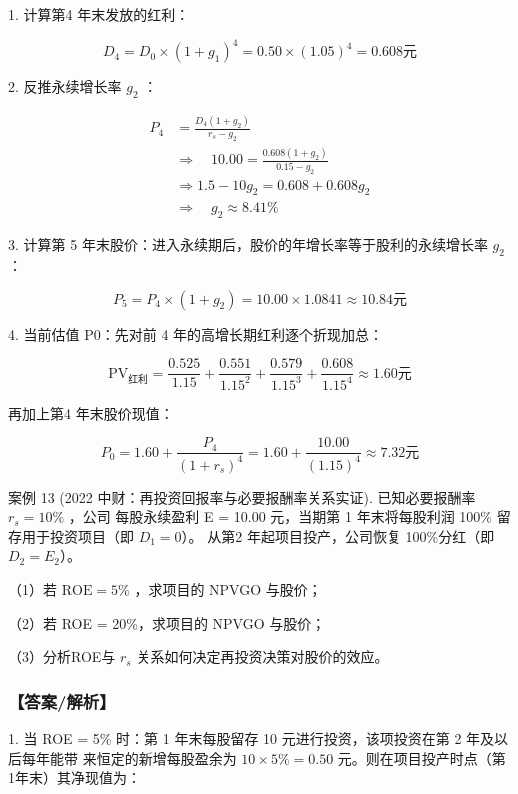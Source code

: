 \documentclass[lang=cn,10pt,color=blue]{elegantbook}
\begin{document}
1. 计算第4 年末发放的红利： 

$$
D _ {4} = D _ {0} \times (1 + g _ {1}) ^ {4} = 0. 5 0 \times (1. 0 5) ^ {4} = 0. 6 0 8 \text {元}
$$

2. 反推永续增长率 $g _ { 2 }$ ： 

$$
\begin{aligned}
  P _ {4} &= \frac {D _ {4} (1 + g _ {2})}{r _ {s} - g _ {2}} \\[1.2ex]
  &\Rightarrow \quad 1 0. 0 0 = \frac {0 . 6 0 8 (1 + g _ {2})}{0 . 1 5 - g _ {2}} \\[1.2ex]
  &\Rightarrow 1. 5 - 1 0 g _ {2} = 0. 6 0 8 + 0. 6 0 8 g _ {2} \\[1.2ex]
  &\Rightarrow \quad \boxed {g _ {2} \approx 8.41\%}
\end{aligned}
$$

3. 计算第 5 年末股价：进入永续期后，股价的年增长率等于股利的永续增长率 $g _ { 2 }$ ： 

$$
P _ {5} = P _ {4} \times (1 + g _ {2}) = 1 0. 0 0 \times 1. 0 8 4 1 \approx 1 0. 8 4 \text {元}
$$

4. 当前估值 P0：先对前 4 年的高增长期红利逐个折现加总： 

$$
\mathrm{PV} _ {\text {红利}} = \frac {0 . 5 2 5}{1 . 1 5} + \frac {0 . 5 5 1}{1 . 1 5 ^ {2}} + \frac {0 . 5 7 9}{1 . 1 5 ^ {3}} + \frac {0 . 6 0 8}{1 . 1 5 ^ {4}} \approx 1. 6 0 \text {元}
$$

再加上第4 年末股价现值： 

$$
P _ {0} = 1. 6 0 + \frac {P _ {4}}{(1 + r _ {s}) ^ {4}} = 1. 6 0 + \frac {1 0 . 0 0}{(1 . 1 5) ^ {4}} \approx 7. 3 2 \text {元}
$$

案例 13 (2022 中财：再投资回报率与必要报酬率关系实证). 已知必要报酬率 $r _ { s } = 1 0 \%$ ，公司 每股永续盈利 E = 10.00 元，当期第 1 年末将每股利润 100\% 留存用于投资项目（即 $D_1 = 0$）。 从第2 年起项目投产，公司恢复 100\%分红（即 $D_2 = E_2$）。 

（1）若 $\mathrm { R O E } = 5 \%$ ，求项目的 NPVGO 与股价； 

（2）若 ROE = 20\%，求项目的 NPVGO 与股价； 

（3）分析ROE与 $r _ { s }$ 关系如何决定再投资决策对股价的效应。 

\subsubsection{【答案/解析】}

1. 当 ROE = 5\% 时：第 1 年末每股留存 10 元进行投资，该项投资在第 2 年及以后每年能带 来恒定的新增每股盈余为 $1 0 \times 5 \% = 0 . 5 0$ 元。则在项目投产时点（第1年末）其净现值为： 
\end{document}
